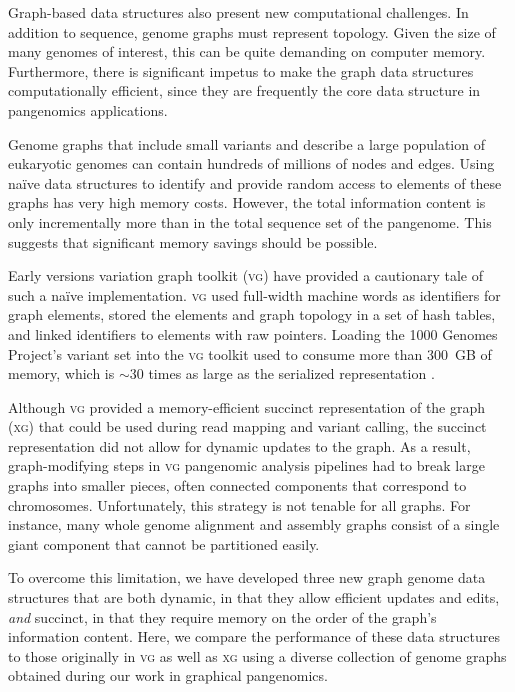 \documentclass{bioinfo}
\begin{document}
Graph-based data structures also present new computational challenges.
In addition to sequence, genome graphs must represent topology.
Given the size of many genomes of interest, this can be quite demanding on computer memory.
Furthermore, there is significant impetus to make the graph data structures computationally efficient, since they are frequently the core data structure in pangenomics applications.

Genome graphs that include small variants and describe a large population of eukaryotic genomes can contain hundreds of millions of nodes and edges.
Using na\"ive data structures to identify and provide random access to elements of these graphs has very high memory costs.
However, the total information content is only incrementally more than in the total sequence set of the pangenome.
This suggests that significant memory savings should be possible.

Early versions variation graph toolkit (\textsc{vg}) \citep{Garrison_2018} have provided a cautionary tale of such a na\"ive implementation.
\textsc{vg} used full-width machine words as identifiers for graph elements, stored the elements and graph topology in a set of hash tables, and linked identifiers to elements with raw pointers.
Loading the 1000 Genomes Project's variant set into the \textsc{vg} toolkit used to consume more than 300~GB of memory, which is $\sim$30 times as large as the serialized representation \citep{Garrison_2019}.

Although \textsc{vg} provided a memory-efficient succinct representation of the graph (\textsc{xg}) that could be used during read mapping and variant calling, the succinct representation did not allow for dynamic updates to the graph.
As a result, graph-modifying steps in \textsc{vg} pangenomic analysis pipelines had to break large graphs into smaller pieces, often connected components that correspond to chromosomes.
Unfortunately, this strategy is not tenable for all graphs.
For instance, many whole genome alignment and assembly graphs consist of a single giant component that cannot be partitioned easily.

To overcome this limitation, we have developed three new graph genome data structures that are both dynamic, in that they allow efficient updates and edits, \emph{and} succinct, in that they require memory on the order of the graph's information content.
Here, we compare the performance of these data structures to those originally in \textsc{vg} as well as \textsc{xg} using a diverse collection of genome graphs obtained during our work in graphical pangenomics.
\end{document}
